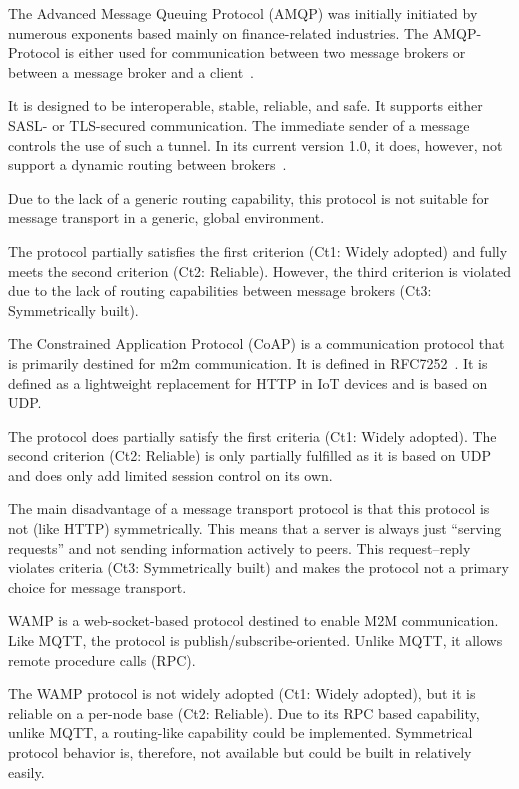 The Advanced Message Queuing Protocol (AMQP) was initially initiated by numerous exponents based mainly on finance-related industries. The AMQP-Protocol is either used for communication between two message brokers or between a message broker and a client~\cite{amqp}.

It is designed to be interoperable, stable, reliable, and safe. It supports either SASL- or TLS-secured communication. The immediate sender of a message controls the use of such a tunnel. In its current version 1.0, it does, however, not support a dynamic routing between brokers~\cite{amqp}.

Due to the lack of a generic routing capability, this protocol is not suitable for message transport in a generic, global environment.

The protocol partially satisfies the first criterion (Ct1: Widely adopted) and fully meets the second criterion (Ct2: Reliable). However, the third criterion is violated due to the lack of routing capabilities between message brokers (Ct3: Symmetrically built).

The Constrained Application Protocol (CoAP) is a communication protocol that is primarily destined for m2m communication. It is defined in RFC7252~\cite{rfc7252}. It is defined as a lightweight replacement for HTTP in IoT devices and is based on UDP.

The protocol does partially satisfy the first criteria (Ct1: Widely adopted). The second criterion (Ct2: Reliable) is only partially fulfilled as it is based on UDP and does only add limited session control on its own.

The main disadvantage of a message transport protocol is that this protocol is not (like HTTP) symmetrically. This means that a server is always just ``serving requests'' and not sending information actively to peers. This request--reply violates criteria (Ct3: Symmetrically built) and makes the protocol not a primary choice for message transport. 

WAMP is a web-socket-based protocol destined to enable M2M communication. Like MQTT, the protocol is publish/subscribe-oriented. Unlike MQTT, it allows remote procedure calls (RPC).

The WAMP protocol is not widely adopted (Ct1: Widely adopted), but it is reliable on a per-node base (Ct2: Reliable). Due to its RPC based capability, unlike MQTT, a routing-like capability could be implemented. Symmetrical protocol behavior is, therefore, not available but could be built in relatively easily.

